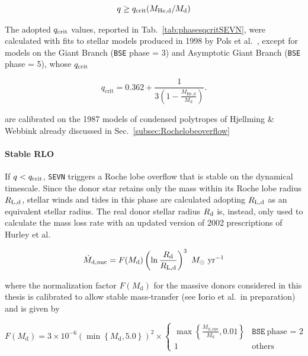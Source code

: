 \documentclass[a4paper,titlepage]{book}     	%
\newcommand{\sun}{\ensuremath{_\odot}}
\newcommand{\mdot}{\ensuremath{\dot{M}}}
\newcommand{\msun}{\ensuremath{M\sun}}
\newcommand{\yr}{\text{yr}}
\begin{document}
\begin{equation}
    q \geq q_{\rm crit}(M_{\rm He,d}/M_{\rm d})
\end{equation}

The adopted $q_{\rm crit}$ values, reported in Tab.\ \ref{tab:phasesqcritSEVN}, were calculated with fits to stellar models produced in 1998 by Pols et al.\ \cite{Pols1998evotracks}, except for models on the Giant Branch (\texttt{BSE} phase = 3) and Asymptotic Giant Branch (\texttt{BSE} phase = 5), whose $q_{\rm crit}$ 

\begin{equation}\label{eq:qcritgiants}
   q_\mathrm{crit} = 0.362 + \frac{1}{3\left(1-\frac{M_\mathrm{He,d}}{M_\mathrm{d}}\right)}.
\end{equation}

are calibrated on the 1987 models of condensed polytropes of Hjellming \& Webbink \cite{hjellmingwebbink1987_coreRLOF} already discussed in Sec.\ \ref{subsec:Rochelobeoverflow}


\paragraph{Stable RLO} If $q < q_{\rm crit}$, \texttt{SEVN} triggers a Roche lobe overflow that is stable on the dynamical timescale. Since the donor star retains only the mass within its Roche lobe radius $R_{\rm L,d}$, stellar winds and tides in this phase are calculated adopting $R_{\rm L,d}$ as an equivalent stellar radius. The real donor stellar radius $R_{\rm d}$ is, instead, only used to calculate the mass loss rate with an updated version of 2002 prescriptions of Hurley et al.\ \cite{Hurley2002}

\begin{equation}\label{eq:masslossrateRLSEVN}
\mdot_{\rm d, nuc} = F(M_\mathrm{d}) \left( \ln \frac{R_\mathrm{d}}{R_\mathrm{L,d}} \right)^3~\msun~\yr^{-1} 
\end{equation}


where the normalization factor $F(M_\mathrm{d})$ for the massive donors considered in this thesis is calibrated to allow stable mass-transfer (see Iorio et al.\ in preparation) and is given by

\begin{equation*}
F(M_\mathrm{d}) =  3 \times 10^{-6} \left( \min \left\{ M_\mathrm{d}, 5.0 \right\} \right)^2 \times
\begin{cases}
\max \left\{ \frac{M_\mathrm{d, env}}{M_\mathrm{d}} ,0.01 \right\} & \texttt{BSE} ~\text{phase = 2} \\
1 & \text{others}
\end{cases}
\end{equation*}
\end{document}
